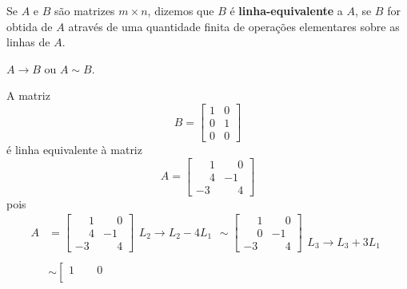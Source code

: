 \begin{definicao}
	Se $A$ e $B$ s\~ao matrizes $m \times n$, dizemos que $B$ \'e \textbf{linha-equivalente} a $A$, se $B$ for obtida de $A$ atrav\'es de uma quantidade finita de opera\c{c}\~oes elementares sobre as linhas de $A$.
\end{definicao}

\begin{notacao}
	$A \rightarrow B$ ou $A \sim B$.
\end{notacao}

\begin{exemplo}
	A matriz
	\[
		B =
			\begin{bmatrix}
				1 & 0\\
				0 & 1\\
				0 & 0
			\end{bmatrix}
	\]
	\'e linha equivalente \`a matriz
	\[
		A =
			\begin{bmatrix}
				\phantom{-}1 & \phantom{-}0\\
				\phantom{-}4 & -1\\
				-3 & \phantom{-}4
			\end{bmatrix}
	\]
	pois
	\begin{align*}
		A &=
			\left[
				\begin{array}{cc}
					\phantom{-}1 & \phantom{-}0\\
					\phantom{-}4 & -1\\
					-3 & \phantom{-}4
				\end{array}
			\right]
			\begin{array}{l}
				\phantom{x}\\
				L_2 \to L_2 - 4L_1\\
				\phantom{x}
			\end{array} \sim
			\left[
				\begin{array}{cc}
					\phantom{-}1 & \phantom{-}0\\
					\phantom{-}0 & -1\\
					-3 & \phantom{-}4
				\end{array}
			\right]
			\begin{array}{l}
				\phantom{x}\\
				\phantom{x}\\
				L_3 \to L_3 + 3L_1
			\end{array}\\ \\ &\sim
			\left[
				\begin{array}{cc}
					1 & \phantom{-}0\\

\end{array}
\end{align*}
\end{exemplo}
